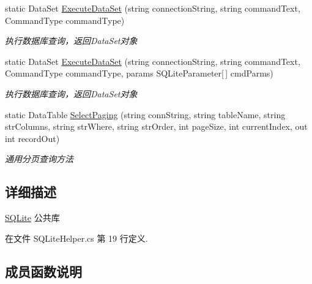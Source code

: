 \begin{DoxyCompactItemize}
static Data\+Set \hyperlink{class_x_c_l_net_tools_1_1_data_base_1_1_s_q_lite_1_1_s_q_lite_helper_a4806433651289941b9507696bb3a64d0}{Execute\+Data\+Set} (string connection\+String, string command\+Text, Command\+Type command\+Type)
\begin{DoxyCompactList}\small\item\em 执行数据库查询，返回\+Data\+Set对象 \end{DoxyCompactList}\item 
static Data\+Set \hyperlink{class_x_c_l_net_tools_1_1_data_base_1_1_s_q_lite_1_1_s_q_lite_helper_a58876af7deacc80974cddb8b1feddee5}{Execute\+Data\+Set} (string connection\+String, string command\+Text, Command\+Type command\+Type, params S\+Q\+Lite\+Parameter\mbox{[}$\,$\mbox{]} cmd\+Parms)
\begin{DoxyCompactList}\small\item\em 执行数据库查询，返回\+Data\+Set对象 \end{DoxyCompactList}\item 
static Data\+Table \hyperlink{class_x_c_l_net_tools_1_1_data_base_1_1_s_q_lite_1_1_s_q_lite_helper_ac6c40082dce532c8ea61efc23c00a825}{Select\+Paging} (string conn\+String, string table\+Name, string str\+Columns, string str\+Where, string str\+Order, int page\+Size, int current\+Index, out int record\+Out)
\begin{DoxyCompactList}\small\item\em 通用分页查询方法 \end{DoxyCompactList}\end{DoxyCompactItemize}


\subsection{详细描述}
\hyperlink{namespace_x_c_l_net_tools_1_1_data_base_1_1_s_q_lite}{S\+Q\+Lite} 公共库 



在文件 S\+Q\+Lite\+Helper.\+cs 第 19 行定义.



\subsection{成员函数说明}
\mbox{\label{class_x_c_l_net_tools_1_1_data_base_1_1_s_q_lite_1_1_s_q_lite_helper_a41a75d29bd830b9d4b6a3ff672a02f62}} 

